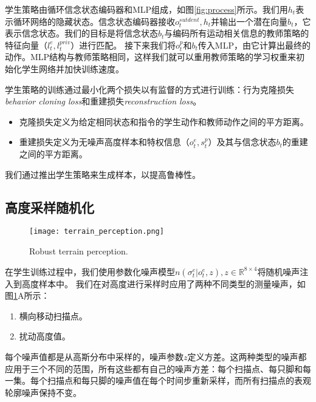   学生策略由循环信念状态编码器和MLP组成，如图\ref{fig:process}所示。我们用$h_t$表示循环网络的隐藏状态。信念状态编码器接收$o_t^{sutdent},h_t$并输出一个潜在向量$b_t$，它表示信念状态。我们的目标是将信念状态$b_t$与编码所有运动相关信息的教师策略的特征向量（$l_t^e, l_t^{priv}$）进行匹配。
  接下来我们将$o_t^p$和$b_t$传入MLP，由它计算出最终的动作。MLP结构与教师策略相同，这样我们就可以重用教师策略的学习权重来初始化学生网络并加快训练速度。
  
  学生策略的训练通过最小化两个损失以有监督的方式进行训练：行为克隆损失\emph{behavior cloning loss}和重建损失\emph{reconstruction loss}。
  \begin{itemize}
    \item 克隆损失定义为给定相同状态和指令的学生动作和教师动作之间的平方距离。
    \item 重建损失定义为无噪声高度样本和特权信息（$o_t^e, s_t^p$）及其与信念状态$b_t$的重建之间的平方距离。
  \end{itemize}
  
  我们通过推出学生策略来生成样本，以提高鲁棒性\cite[p]{Ross_Gordon_Bagnell_2010,Czarnecki_Pascanu_Osindero_Jayakumar_Swirszcz_Jaderberg_2019}。
  
  \subsection[高度采样随机化]{高度采样随机化}
  
  \begin{figure}
    \centering
    \texttt{[image: terrain\_perception.png]}
    \caption{Robust terrain perception\cite[p10]{Miki_Lee_Hwangbo_Wellhausen_Koltun_Hutter_2022}.}
    \label{fig:terrain_perception}
  \end{figure}
  
  在学生训练过程中，我们使用参数化噪声模型$n(\sigma_t^e|o_t^e,z),z\in \mathbb{R}^{8\times 4}$将随机噪声注入到高度样本中。
  我们在对高度进行采样时应用了两种不同类型的测量噪声，如图\ref{fig:terrain_perception}A所示：
  \begin{enumerate}
    \item 横向移动扫描点。
    \item 扰动高度值。
  \end{enumerate}
  
  每个噪声值都是从高斯分布中采样的，噪声参数$z$定义方差。这两种类型的噪声都应用于三个不同的范围，所有这些都有自己的噪声方差：每个扫描点、每只脚和每一集。每个扫描点和每只脚的噪声值在每个时间步重新采样，而所有扫描点的表观轮廓噪声保持不变。
  
